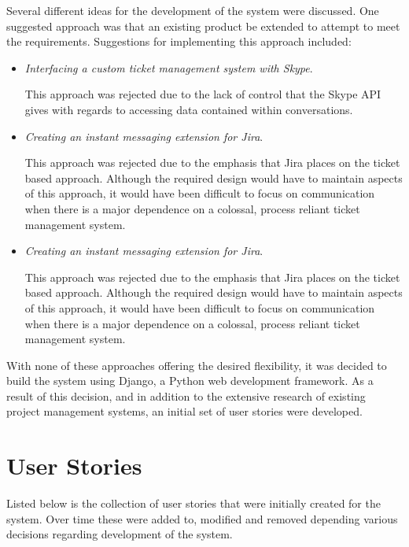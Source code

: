 \documentclass[a4paper]{l3proj}
\begin{document}
Several different ideas for the development of the system were discussed. One suggested approach was that an existing product be extended to attempt to meet the requirements. Suggestions for implementing this approach included:

\begin{itemize}
\item \textit{Interfacing a custom ticket management system with Skype}. \par This approach was rejected due to the lack of control that the Skype API gives with regards to accessing data contained within conversations.
\item \textit{Creating an instant messaging extension for Jira}. \par This approach was rejected due to the emphasis that Jira places on the ticket based approach. Although the required design would have to maintain aspects of this approach, it would have been difficult to focus on communication when there is a major dependence on a colossal, process reliant ticket management system.

\item \textit{Creating an instant messaging extension for Jira}. \par This approach was rejected due to the emphasis that Jira places on the ticket based approach. Although the required design would have to maintain aspects of this approach, it would have been difficult to focus on communication when there is a major dependence on a colossal, process reliant ticket management system.

\end{itemize}

With none of these approaches offering the desired flexibility, it was decided to build the system using Django, a Python web development framework.  As a result of this decision, and in addition to the extensive research of existing project management systems, an initial set of user stories were developed.

\section{User Stories}
\label{userStories}

Listed below is the collection of user stories that were initially created for the system.  Over time these were added to, modified and removed depending various decisions regarding development of the system.
\end{document}
